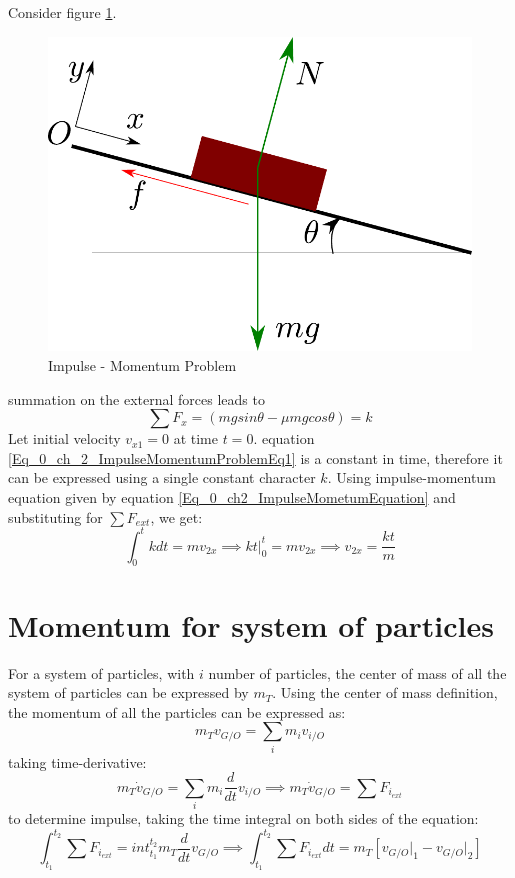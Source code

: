 Consider figure \ref{fig_0_ch_0_ImpulseMomentumProblem}. 
\newpage
\begin{figure}[h!]
	\centering
	\includegraphics[width=0.6\linewidth]{Bilder/09_ImpulseProblem.pdf}
	\caption{Impulse - Momentum Problem}
	\label{fig_0_ch_0_ImpulseMomentumProblem}
\end{figure}
summation on the external forces leads to
\begin{equation} \label{Eq_0_ch_2_ImpulseMomentumProblemEq1}
	\sum F_{x} = (mg sin\theta - \mu mg cos\theta) = k
\end{equation}
Let initial velocity $v_{x1} = 0$ at time $t = 0$. equation \eqref{Eq_0_ch_2_ImpulseMomentumProblemEq1} is a constant in time, therefore it can be expressed using a single constant character $k$. Using impulse-momentum equation given by equation \eqref{Eq_0_ch2_ImpulseMometumEquation} and substituting for $\sum F_{ext}$, we get:
\begin{equation}
	\int_{0}^{t} k dt = m v_{2x} \implies k t \Big|_0^t = m v_{2x} \implies v_{2x} = \frac{k t}{m}
\end{equation}

\section{Momentum for system of particles}

For a system of particles, with $i$ number of particles, the center of mass of all the system of particles can be expressed by $m_{T}$. Using the center of mass definition, the momentum of all the particles can be expressed as:
\begin{equation}
	m_{T} v_{G/O} = \sum _i m_{i} v_{i/O}
\end{equation}
taking time-derivative:
\begin{equation}
m_{T} \dot{v}_{G/O} = \sum _i m_{i} \frac{d}{dt} v_{i/O} \implies m_{T} \dot{v}_{G/O} = \sum F_{i_{ext}}
\end{equation}
to determine impulse, taking the time integral on both sides of the equation:
\begin{equation} \label{Eq_0_ch_2_MomentumEquationForSystemOfParticles}
	\int_{t_{1}}^{t_{2}} \sum F_{i_{ext}} = int_{t_{1}}^{t_{2}} m_{T} \frac{d}{dt}{v}_{G/O} \implies \int_{t_{1}}^{t_{2}} \sum F_{i_{ext}} dt = m_{T} \left[ {v}_{G/O} \Big |_1 - {v}_{G/O} \Big |_2 \right] 
\end{equation}

